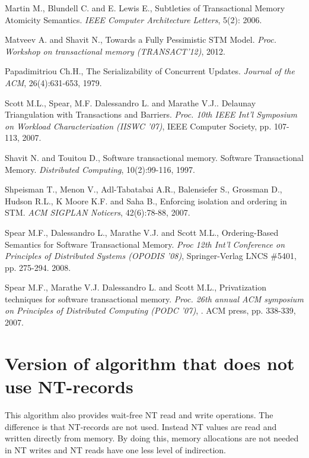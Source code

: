 \documentclass[11pt,letterpaper]{article}
\begin{document}
{\begin{thebibliography}{guerraoui08}
 Martin M.,  Blundell C.  and E. Lewis E.,
 Subtleties of Transactional Memory Atomicity Semantics. 
{\it IEEE Computer Architecture  Letters},  5(2):  2006.


Matveev A. and  Shavit N.,
Towards a Fully Pessimistic STM Model. 
{\it Proc. Workshop on transactional memory (TRANSACT'12)}, 2012.



Papadimitriou Ch.H., 
The Serializability of Concurrent Updates. 
{\it Journal of the ACM},  26(4):631-653, 1979. 


 Scott M.L.,  Spear, M.F. Dalessandro L.  and  Marathe V.J..
 Delaunay Triangulation with Transactions and Barriers. 
{\it Proc.  10th IEEE Int'l Symposium on Workload Characterization (IISWC '07)},
 IEEE Computer Society, pp. 107-113, 2007.





 Shavit N. and  Touitou D.,
 Software transactional memory. 
Software Transactional Memory. 
{\it Distributed  Computing}, 10(2):99-116, 1997. 


 Shpeisman T.,  Menon V.,  Adl-Tabatabai A.R.,  Balensiefer  S.,  Grossman D.,
 Hudson R.L., K Moore K.F.  and  Saha B., 
Enforcing isolation and ordering in STM. 
{\it ACM  SIGPLAN Noticers}, 42(6):78-88,  2007.





Spear M.F.,  Dalessandro L.,  Marathe V.J. and  Scott M.L., 
Ordering-Based Semantics for Software Transactional Memory. 
{\it Proc  12th Int'l Conference on Principles of Distributed Systems 
(OPODIS '08)},  Springer-Verlag LNCS \#5401, pp. 275-294. 2008. 



Spear M.F.,  Marathe V.J. Dalessandro L. and  Scott M.L., 
Privatization techniques for software transactional memory. 
{\it Proc. 26th  annual ACM symposium on Principles of Distributed Computing 
(PODC '07)}, . ACM press, pp.  338-339, 2007.



\end{thebibliography}

}

\appendix
\section{Version of algorithm that does not use NT-records}
This algorithm also provides wait-free NT read and write operations.
The difference is that NT-records are not used.
Instead NT values are read and written directly from memory.
By doing this, memory allocations are not needed in NT writes and NT reads have
one less level of indirection.
\end{document}

